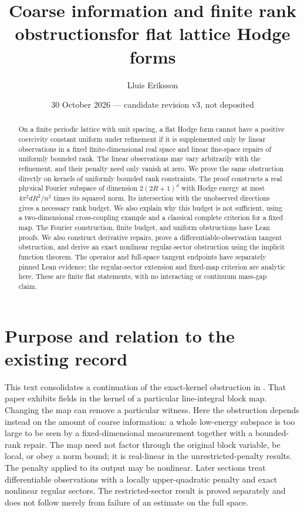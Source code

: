 \documentclass[11pt]{article}
\title{Coarse information and finite rank obstructions\newline for flat lattice Hodge forms}
\author{Lluis Eriksson}
\date{30 October 2026 --- candidate revision v3, not deposited}
\begin{document}
\maketitle
\begin{abstract}
On a finite periodic lattice with unit spacing, a flat Hodge form cannot have
a positive coercivity constant uniform under refinement if it is supplemented
only by linear observations in a fixed finite-dimensional real space and
linear fine-space repairs of uniformly bounded rank. The linear observations
may vary arbitrarily with the
refinement, and their penalty need only vanish at zero. We prove the same
obstruction directly on kernels of uniformly bounded rank constraints.
The proof constructs a real physical Fourier subspace of dimension
$2(2R+1)^d$ with Hodge energy at most $4\pi^2dR^2/n^2$ times its squared norm.
Its intersection with the unobserved directions gives a necessary rank budget.
We also explain why this budget is not sufficient, using a two-dimensional
cross-coupling example and a classical complete criterion for a fixed map.
The Fourier construction, finite budget, and uniform obstructions have Lean
proofs. We also construct derivative repairs, prove a differentiable-observation tangent obstruction, and derive an exact nonlinear regular-sector obstruction using the implicit function theorem. The operator and full-space tangent endpoints have separately pinned Lean evidence; the regular-sector extension and fixed-map criterion are analytic here. These are finite
flat statements, with no interacting or continuum mass-gap claim.
\end{abstract}

\section{Purpose and relation to the existing record}
This text consolidates a continuation of the exact-kernel obstruction in
\cite{eriksson}. That paper exhibits fields in the kernel of a particular
line-integral block map. Changing the map can remove a particular witness.
Here the obstruction depends instead on the amount of coarse information:
a whole low-energy subspace is too large to be seen by a fixed-dimensional
measurement together with a bounded-rank repair. The map need not factor
through the original block variable, be local, or obey a norm bound; it is
real-linear in the unrestricted-penalty results. The penalty applied to its output may be nonlinear. Later sections treat differentiable observations with a locally upper-quadratic penalty and exact nonlinear regular sectors.
The restricted-sector result is proved separately and does not follow merely
from failure of an estimate on the full space.
\end{document}
